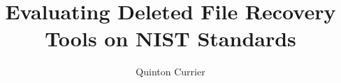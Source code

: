 \documentclass[11pt]{article}
\begin{document}
\date{}

\title {\vspace{-1in} \Large{Evaluating Deleted File Recovery Tools on NIST Standards} \vspace{-.25in}}
\author{\large{Quinton Currier}}
\maketitle
\vspace{-.3in}

\thispagestyle{empty} 


%

%

%
%
\end{document}
